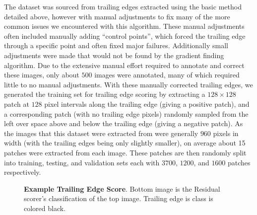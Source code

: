 The dataset was sourced from trailing edges extracted using the basic method detailed above, however with manual adjustments to fix many of the more common issues we encountered with this algorithm.
These manual adjustments often included manually adding ``control points'', which forced the trailing edge through a specific point and often fixed major failures.
Additionally small adjustments were made that would not be found by the gradient finding algorithm.
Due to the extensive manual effort required to annotate and correct these images, only about $500$ images were annotated, many of which required little to no manual adjustments. %
With these manually corrected trailing edges, we generated the training set for trailing edge scoring by extracting a $128 \times 128$ patch at $128$ pixel intervals along the trailing edge (giving a positive patch), and a corresponding patch (with no trailing edge pixels) randomly sampled from the left over space above and below the trailing edge (giving a negative patch).
As the images that this dataset were extracted from were generally $960$ pixels in width (with the trailing edges being only slightly smaller), on average about 15 patches were extracted from each image. 
These patches are then randomly split into training, testing, and validation sets each with $3700$, $1200$, and $1600$ patches respectively.


\begin{figure}[t]%
\centering
{}
\newline
{}
\caption[]{\textbf{Example Trailing Edge Score}. Bottom image is the Residual scorer's classification of the top image. Trailing edge is class is colored black.}
\label{fig:example_te_score_annotres}
\end{figure}



